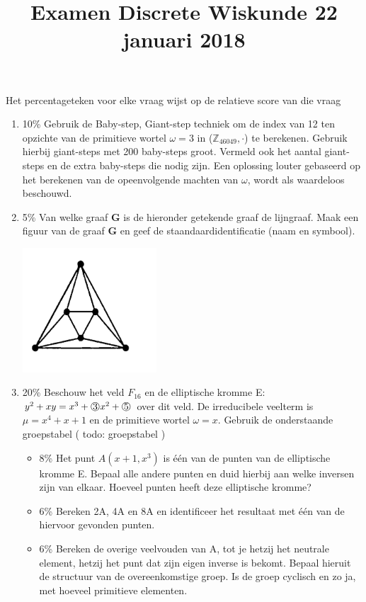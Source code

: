\documentclass{article}
\def\warning#1{\color{red} #1 \color{black}}
\def\note#1{\color{cyan} #1 \color{black}}
\def\circled#1{\raisebox{.5pt}{\textcircled{\raisebox{-.9pt} {#1}}}}
\begin{document}
\title{Examen Discrete Wiskunde 22 januari 2018}
\date{}
\author{}
\maketitle

\note{Het percentageteken voor elke vraag wijst op de relatieve score van die vraag}

\begin{enumerate}
\item {\note{10\%} Gebruik de Baby-step, Giant-step techniek om de index van 12 ten opzichte van de primitieve wortel $\omega = 3$ in ($\mathbb{Z}_{46049}, \cdot$) te berekenen. Gebruik hierbij giant-steps met 200 baby-steps groot. Vermeld ook het aantal giant-steps en de extra baby-steps die nodig zijn. Een oplossing louter gebaseerd op het berekenen van de opeenvolgende machten van $\omega$, wordt als waardeloos beschouwd.}
\item {\note{5\%} Van welke graaf {\bf G} is de hieronder getekende graaf de lijngraaf. Maak een figuur van de graaf {\bf G} en geef de staandaardidentificatie (naam en symbool).

    \includegraphics[width=5cm]{lijngraaf}}

\item {\note{20\%} Beschouw het veld $F_{16}$ en de elliptische kromme E: $y^2+xy = x^3 + \circled{3}x^2 + \circled{5} $ over dit veld. De irreducibele veelterm is $\mu = x^4 + x + 1$ en de primitieve wortel $\omega = x$. Gebruik de onderstaande groepstabel (\warning{todo: groepstabel})

    \begin{itemize}
    \item {\note{8\%} Het punt $A(x + 1, x^3)$ is één van de punten van de elliptische kromme E. Bepaal alle andere punten en duid hierbij aan welke inversen zijn van elkaar. Hoeveel punten heeft deze elliptische kromme?}
    \item {\note{6\%} Bereken 2A, 4A en 8A en identificeer het resultaat met één van de hiervoor gevonden punten.}
      \item {\note{6\%} Bereken de overige veelvouden van A, tot je hetzij het neutrale element, hetzij het punt dat zijn eigen inverse is bekomt. Bepaal hieruit de structuur van de overeenkomstige groep. Is de groep cyclisch en zo ja, met hoeveel primitieve elementen.}


\end{itemize}}
\end{enumerate}
\end{document}
